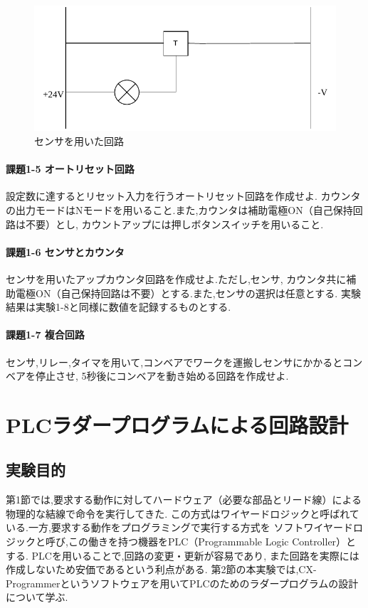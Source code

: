\begin{figure}[H]
  \centering
  \includegraphics[scale=0.5]{sozai/4.pdf}
  \caption{センサを用いた回路}
\end{figure}

\paragraph{課題1-5 オートリセット回路}
設定数に達するとリセット入力を行うオートリセット回路を作成せよ.
カウンタの出力モードはNモードを用いること.また,カウンタは補助電極ON（自己保持回路は不要）とし,
カウントアップには押しボタンスイッチを用いること.

\paragraph{課題1-6 センサとカウンタ}
センサを用いたアップカウンタ回路を作成せよ.ただし,センサ,
カウンタ共に補助電極ON（自己保持回路は不要）とする.また,センサの選択は任意とする.
実験結果は実験1-8と同様に数値を記録するものとする.

\paragraph{課題1-7 複合回路}
センサ,リレー,タイマを用いて,コンベアでワークを運搬しセンサにかかるとコンベアを停止させ,
5秒後にコンベアを動き始める回路を作成せよ.


\section{PLCラダープログラムによる回路設計}

\subsection{実験目的}
第1節では,要求する動作に対してハードウェア（必要な部品とリード線）による物理的な結線で命令を実行してきた.
この方式はワイヤードロジックと呼ばれている.一方,要求する動作をプログラミングで実行する方式を
ソフトワイヤードロジックと呼び,この働きを持つ機器をPLC（Programmable Logic Controller）とする.
PLCを用いることで,回路の変更・更新が容易であり,
また回路を実際には作成しないため安価であるという利点がある.
第2節の本実験では,CX-Programmerというソフトウェアを用いてPLCのためのラダープログラムの設計について学ぶ.



